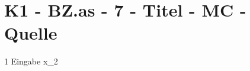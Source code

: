 \section{K1 - BZ.as - 7 - Titel - MC - Quelle}

\begin{langesbeispiel} \item[1] %
Eingabe x_2
\end{langesbeispiel}